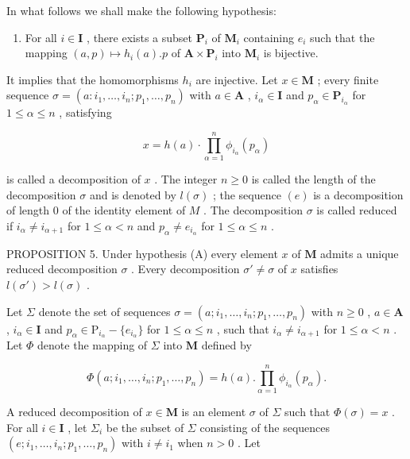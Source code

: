 In what follows we shall make the following hypothesis:

\begin{enumerate}
\def\labelenumi{(\Alph{enumi})}
\tightlist
\item
  For all \(i \in \mathbf{I}\) , there exists a subset \(\mathbf{P}_i\) of \(\mathbf{M}_i\) containing \(e_i\) such that the mapping \((a, p) \mapsto h_i(a).p\) of \(\mathbf{A} \times \mathbf{P}_i\) into \(\mathbf{M}_i\) is bijective.
\end{enumerate}

It implies that the homomorphisms \(h_i\) are injective. Let \(x \in \mathbf{M}\) ; every finite sequence \(\sigma = (a: i_1, \ldots, i_n; p_1, \ldots, p_n)\) with \(a \in \mathbf{A}\) , \(i_\alpha \in \mathbf{I}\) and \(p_\alpha \in \mathbf{P}_{i_\alpha}\) for \(1 \leqslant \alpha \leqslant n\) , satisfying

\[
x = h (a) \cdot \prod_ {\alpha = 1} ^ {n} \phi_ {i _ {\alpha}} (p _ {\alpha})\tag{3}
\]

is called a decomposition of \(x\) . The integer \(n \geqslant 0\) is called the length of the decomposition \(\sigma\) and is denoted by \(l(\sigma)\) ; the sequence \((e)\) is a decomposition of length 0 of the identity element of \(M\) . The decomposition \(\sigma\) is called reduced if \(i_{\alpha} \neq i_{\alpha + 1}\) for \(1 \leqslant \alpha < n\) and \(p_{\alpha} \neq e_{i_{\alpha}}\) for \(1 \leqslant \alpha \leqslant n\) .

PROPOSITION 5. Under hypothesis (A) every element \(x\) of \(\mathbf{M}\) admits a unique reduced decomposition \(\sigma\) . Every decomposition \(\sigma' \neq \sigma\) of \(x\) satisfies \(l(\sigma') > l(\sigma)\) .


Let \(\Sigma\) denote the set of sequences \(\sigma = (a; i_1, \ldots, i_n; p_1, \ldots, p_n)\) with \(n \geqslant 0\) , \(a \in \mathbf{A}\) , \(i_\alpha \in \mathbf{I}\) and \(p_\alpha \in \mathrm{P}_{i_\alpha} - \{e_{i_\alpha}\}\) for \(1 \leqslant \alpha \leqslant n\) , such that \(i_\alpha \neq i_{\alpha+1}\) for \(1 \leqslant \alpha < n\) . Let \(\Phi\) denote the mapping of \(\Sigma\) into \(\mathbf{M}\) defined by

\[
\Phi (a; i _ {1}, \dots , i _ {n}; p _ {1}, \dots , p _ {n}) = h (a). \prod_ {\alpha = 1} ^ {n} \phi_ {i _ {\alpha}} (p _ {\alpha}).\tag{4}
\]

A reduced decomposition of \(x \in \mathbf{M}\) is an element \(\sigma\) of \(\Sigma\) such that \(\Phi(\sigma) = x\) . For all \(i \in \mathbf{I}\) , let \(\Sigma_i\) be the subset of \(\Sigma\) consisting of the sequences \((e; i_1, \ldots, i_n; p_1, \ldots, p_n)\) with \(i \neq i_1\) when \(n > 0\) . Let

